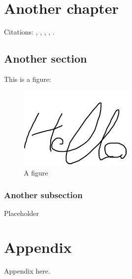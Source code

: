 \documentclass[12pt]{book}
\renewcommand{\&}{\textup{\symbol{`\&}}}
\begin{document}
\chapter{Another chapter}
\label{background}

Citations: \citep{lane2019natural}, \citet{lane2019natural}, \citep{lane2019natural, castano2021internet}, \citet{lane2019natural, castano2021internet}, \cite{lane2019natural}.

\section{Another section}
\label{sec:section}

This is a figure:

\begin{figure}[H]
  \centering
  \includegraphics[width=0.5\textwidth]{picture.png}
  \caption{A figure}
  \label{fig:figure}
\end{figure}

\subsection{Another subsection}
\label{subsec:subsection}

Placeholder





\appendix

\chapter{Appendix}

Appendix here.
\end{document}
